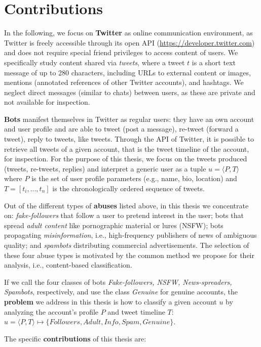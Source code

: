 \section{Contributions}
\label{sec:contributions}
In the following, we focus on \textbf{Twitter} as online communication environment, as Twitter is freely accessible through its open API (\url{https://developer.twitter.com}) and does not require special friend privileges to access content of users. We specifically study content shared via \emph{tweets}, where a tweet $t$ is a short text message of up to 280 characters, including URLs to external content or images, mentions (annotated references of other Twitter accounts), and hashtags. We neglect direct messages (similar to chats) between users, as these are private and not available for inspection. 

\textbf{Bots} manifest themselves in Twitter as regular users: they have an own account and user profile and are able to tweet (post a message), re-tweet (forward a tweet), reply to tweets, like tweets. Through the API of Twitter, it is possible to retrieve all tweets of a given account, that is the tweet timeline of the account, for inspection. For the purpose of this thesis, we focus on the tweets produced (tweets, re-tweets, replies) and interpret a generic user as a tuple $u = \langle P, T \rangle$ where $P$ is the set of 
user profile parameters (e.g., name, bio, location) and $T = [t_i,...,t_n]$ is the chronologically ordered sequence of tweets.

Out of the different types of \textbf{abuses} listed above, in this thesis we concentrate on: \emph{fake-followers} that follow a user to pretend interest in the user; bots that spread \emph{adult content} like pornographic material or lures (NSFW); bots propagating \emph{misinformation}, i.e., high-frequency publishers of news of ambiguous quality; and \emph{spambots} distributing commercial advertisements. The selection of these four abuse types is motivated by the common method we propose for their analysis, i.e., content-based classification.

If we call the four classes of bots \emph{Fake-followers, NSFW, News-spreaders, Spambots}, respectively, 
and use the class \emph{Genuine} for genuine accounts, the \textbf{problem} we address in this thesis is how to classify a given account $u$ by analyzing the account's profile $P$ and tweet timeline $T$:  
$u = \langle P, T \rangle \mapsto \{Followers, Adult, Info, Spam,Genuine\}$.

The specific \textbf{contributions} of this thesis are:

